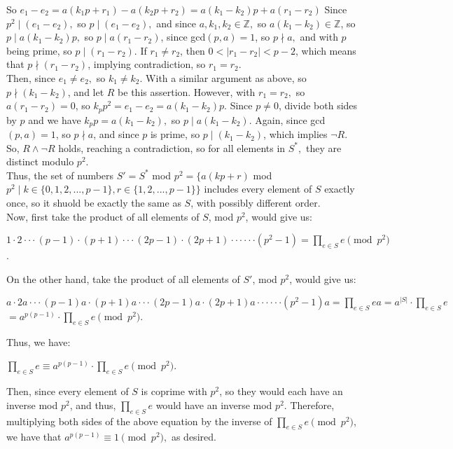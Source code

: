 \documentclass{article}
\begin{document}
So $e_1 - e_2 = a(k_1p+r_1) - a(k_2p+r_2) = a(k_1-k_2)p + a(r_1-r_2)$
Since $p^2\mid(e_1-e_2),$ so $p\mid(e_1-e_2),$ and since $a,k_1,k_2\in\mathbb{Z},$ so $a(k_1-k_2)\in\mathbb{Z}$, so $p\mid a(k_1-k_2)p,$ so $p\mid a(r_1-r_2)$, since gcd$(p,a)=1$, so $p\nmid a,$ and with $p$ being prime, so $p\mid(r_1-r_2)$. If $r_1\neq r_2$, then $0<|r_1-r_2|<p-2$, which means that $p\nmid(r_1-r_2)$, implying contradiction, so $r_1 = r_2.$ \\[.1cm]
\indent Then, since $e_1\neq e_2,$ so $k_1\neq k_2.$ With a similar argument as above, so $p\nmid(k_1-k_2)$, and let $R$ be this assertion. However, with $r_1 = r_2,$ so $a(r_1-r_2) = 0$, so $k_pp^2 = e_1-e_2 = a(k_1-k_2)p.$ Since $p\neq0$, divide both sides by $p$ and we have $k_pp = a(k_1-k_2),$ so $p\mid a(k_1-k_2)$. Again, since gcd$(p,a) = 1$, so $p\nmid a$, and since $p$ is prime, so $p\mid(k_1-k_2)$, which implies $\neg R$. So, $R\land\neg R$ holds, reaching a contradiction, so for all elements in $S^*,$ they are distinct modulo $p^2.$ \\[.1cm]
\indent Thus, the set of numbers $S' = S^*$ mod $p^2 = \big\{a(kp+r)$ mod $p^2\mid k\in\{0,1,2,...,p-1\}, r\in\{1,2,...,p-1\}\big\}$ includes every element of $S$ exactly once, so it shuold be exactly the same as $S$, with possibly different order. \\[.1cm]
\indent Now, first take the product of all elements of $S$, mod $p^2$, would give us:
\begin{center}
$1\cdot2\cdot\cdot\cdot(p-1)\cdot(p+1)\cdot\cdot\cdot(2p-1)\cdot(2p+1)\cdot\cdot\cdot\cdot\cdot\cdot(p^2-1) =
\prod\limits_{e\in S} e\pmod{p^2}$.
\end{center}
On the other hand, take the product of all elements of $S'$, mod $p^2$, would give us:
\begin{center}
$a\cdot2a\cdot\cdot\cdot(p-1)a\cdot(p+1)a\cdot\cdot\cdot(2p-1)a\cdot(2p+1)a\cdot\cdot\cdot\cdot\cdot\cdot(p^2-1)a = \prod\limits_{e\in S} ea = a^{|S|}\cdot\prod\limits_{e\in S} e $ \\[.1cm]
$ = a^{p(p-1)}\cdot\prod\limits_{e\in S} e \pmod{p^2}.$
\end{center}
Thus, we have:
\begin{center}
$\prod\limits_{e\in S} e\equiv a^{p(p-1)}\cdot\prod\limits_{e\in S} e \pmod{p^2}$.
\end{center}
\indent Then, since every element of $S$ is coprime with $p^2$, so they would each have an inverse mod $p^2$, and thus, $\prod\limits_{e\in S} e$ would have an inverse mod $p^2.$ Therefore, multiplying both sides of the above equation by the inverse of $\prod\limits_{e\in S} e\pmod{p^2}$, we have that $a^{p(p-1)}\equiv1\pmod{p^2},$ as desired. \\[.1cm]
\end{document}
